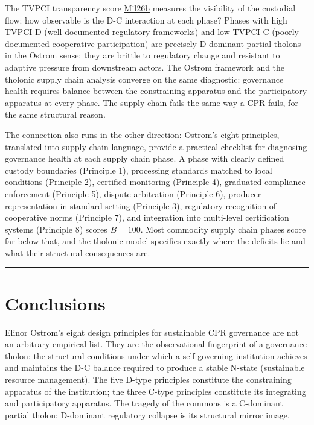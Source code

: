 \documentclass[12pt]{article}
\begin{document}
The TVPCI transparency score
\href{https://github.com/baardev/truevalue/blob/main/docnav/Research/papers/2_supply-chain-transparency-tvpci/2_supply-chain-transparency-tvpci.pdf}{Mil26b}
measures the visibility of the custodial flow: how observable is the D-C
interaction at each phase? Phases with high TVPCI-D (well-documented
regulatory frameworks) and low TVPCI-C (poorly documented cooperative
participation) are precisely D-dominant partial tholons in the Ostrom
sense: they are brittle to regulatory change and resistant to adaptive
pressure from downstream actors. The Ostrom framework and the tholonic
supply chain analysis converge on the same diagnostic: governance health
requires balance between the constraining apparatus and the
participatory apparatus at every phase. The supply chain fails the same
way a CPR fails, for the same structural reason.

The connection also runs in the other direction: Ostrom's eight
principles, translated into supply chain language, provide a practical
checklist for diagnosing governance health at each supply chain phase. A
phase with clearly defined custody boundaries (Principle 1), processing
standards matched to local conditions (Principle 2), certified
monitoring (Principle 4), graduated compliance enforcement (Principle
5), dispute arbitration (Principle 6), producer representation in
standard-setting (Principle 3), regulatory recognition of cooperative
norms (Principle 7), and integration into multi-level certification
systems (Principle 8) scores \(B = 100\). Most commodity supply chain
phases score far below that, and the tholonic model specifies exactly
where the deficits lie and what their structural consequences are.

\begin{center}\rule{0.5\linewidth}{0.5pt}\end{center}

\section{Conclusions}\label{conclusions}

Elinor Ostrom's eight design principles for sustainable CPR governance
are not an arbitrary empirical list. They are the observational
fingerprint of a governance tholon: the structural conditions under
which a self-governing institution achieves and maintains the D-C
balance required to produce a stable N-state (sustainable resource
management). The five D-type principles constitute the constraining
apparatus of the institution; the three C-type principles constitute its
integrating and participatory apparatus. The tragedy of the commons is a
C-dominant partial tholon; D-dominant regulatory collapse is its
structural mirror image.
\end{document}
